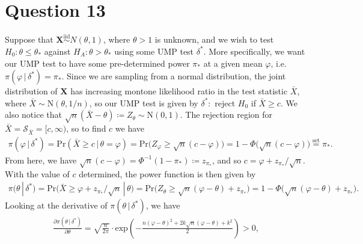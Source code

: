 \documentclass[10pt]{article}
\begin{document}
\section{Question 13} \noindent
Suppose that \(\bm{X} \overset{\mathrm{iid}}{\sim} N(\theta, 1)\), where \(\theta > 1\) is unknown, and we wish to test 
\(H_0 : \theta \le \theta_*\) against \(H_A : \theta > \theta_*\) using some UMP test \(\delta^*\). 
More specifically, we want our UMP test to have some pre-determined power \(\pi_*\) at a given mean \(\varphi\), i.e. \(\pi(\varphi \,|\, \delta^*) = \pi_*\).
Since we are sampling from a normal distribution, the joint distribution of \(\bm{X}\) has increasing montone likelihood ratio 
in the test statistic \(\bar{X}\), where \(\bar{X} \sim \mathrm{N}(\theta, 1 / n)\), so our UMP test is given by \(\delta^* : \) reject 
\(H_0\) if \(\bar{X} \ge c\). 
We also notice that \(\sqrt{n}(\bar{X} - \theta) \coloneqq Z_{\theta} \sim \mathrm{N}(0,1)\). 
The rejection region for \(\bar{X} = \mathcal{S}_{\bar{X}} = [c,\infty)\), so to find \(c\) we have 
\begin{align*}
    \pi (\varphi \,|\, \delta^*)
    = \mathrm{Pr}(\bar{X} \ge c \,|\, \theta = \varphi)
    = \mathrm{Pr} \big( Z_{\varphi} \ge \sqrt{n}(c - \varphi) \big)
    = 1 - \Phi \big( \sqrt{n}(c - \varphi) \big)
    \overset{\mathrm{set}}{=} \pi_*.
\end{align*}
From here, we have \(\sqrt{n}(c - \varphi) = \Phi^{-1}(1 - \pi_*) \coloneqq z_{\pi_*}\), and so \(c = \varphi + z_{\pi_*} / \sqrt{n}\).
With the value of \(c\) determined, the power function is then given by 
\begin{align*}
    \pi(\theta \,|\, \delta^*)
    = \mathrm{Pr} \big( \bar{X} \ge \varphi + z_{\pi_*} / \sqrt{n} \,|\, \theta \big)
    = \mathrm{Pr} \big( Z_{\theta} \ge \sqrt{n}(\varphi - \theta) + z_{\pi_*} \big)
    = 1 - \Phi \big(  \sqrt{n}(\varphi - \theta) + z_{\pi_*} \big).
\end{align*}
Looking at the derivative of \(\pi(\theta \,|\, \delta^*)\), we have 
\begin{align*}
    \frac{\partial \pi(\theta \,|\, \delta^*)}{\partial \theta}
    = \sqrt{\frac{n}{2\pi}} \cdot \mathrm{exp} \left( - \frac{n(\varphi - \theta)^2 + 2 k \sqrt{n}(\varphi - \theta) + k^2}{2} \right)
    > 0,
\end{align*}
\end{document}
